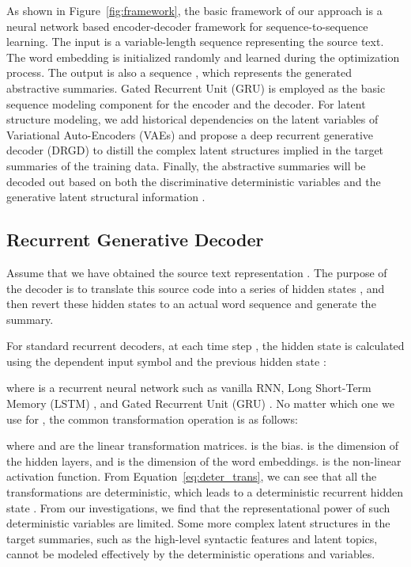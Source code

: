 \documentclass[11pt,letterpaper]{article}
\begin{document}
As shown in Figure~\ref{fig:framework}, the basic framework of our approach is a neural network based encoder-decoder framework for sequence-to-sequence learning.
The input is a variable-length sequence  representing the source text.
The word embedding  is initialized randomly and learned during the optimization process. 
The output is also a sequence , which represents the generated abstractive summaries.
Gated Recurrent Unit (GRU) \cite{cho2014learning} is employed as the basic sequence modeling component for the encoder and the decoder.
For latent structure modeling, 
we add historical dependencies on the latent variables of Variational Auto-Encoders (VAEs) and propose a deep recurrent generative decoder (DRGD) to distill the complex latent structures implied in the target summaries of the training data. 
Finally, the abstractive summaries will be decoded out based on both the discriminative deterministic variables  and the generative latent structural information .


\subsection{Recurrent Generative Decoder}

Assume that we have obtained the source text representation .
The purpose of the decoder is to translate this source code  into a series of hidden states , and then revert these hidden states to an actual word sequence and generate the summary.

For standard recurrent decoders, at each time step , the hidden state  is calculated using the dependent input symbol  and the previous hidden state :

where  is a recurrent neural network such as vanilla RNN, Long Short-Term Memory (LSTM) \cite{hochreiter1997long}, and Gated Recurrent Unit (GRU) \cite{cho2014learning}. 
No matter which one we use for , the common transformation operation is as follows:

where  and  are the linear transformation matrices.  is the bias.  is the dimension of the hidden layers, and  is the dimension of the word embeddings.
 is the non-linear activation function.
From Equation~\ref{eq:deter_trans}, we can see that all the transformations are deterministic, which leads to a deterministic recurrent hidden state .
From our investigations, we find that the representational power of such deterministic variables are limited.
Some more complex latent structures in the target summaries, such as the high-level syntactic features and latent topics, cannot be modeled effectively by the deterministic operations and variables.
\end{document}
